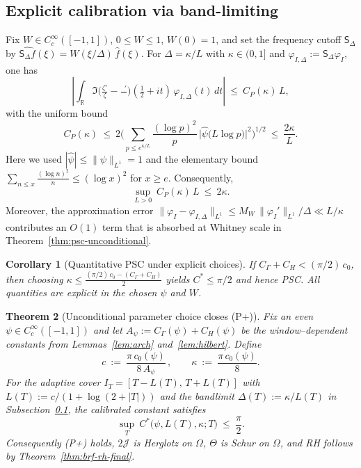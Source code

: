 \documentclass[11pt]{article}
\newtheorem{theorem}{Theorem}
\newtheorem{corollary}[theorem]{Corollary}
\theoremstyle{definition}
\theoremstyle{remark}
\newcommand{\R}{\mathbb{R}}
\DeclareMathOperator{\dettwo}{det_2}
\begin{document}
\subsection{Explicit calibration via band-limiting}\label{subsec:explicit-calibration}
Fix $W\in C_c^\infty([-1,1])$, $0\le W\le 1$, $W(0)=1$, and set the frequency cutoff $\mathsf S_\Delta$ by $\widehat{\mathsf S_\Delta f}(\xi)=W(\xi/\Delta)\,\widehat f(\xi)$. For $\Delta=\kappa/L$ with $\kappa\in(0,1]$ and $\varphi_{I,\Delta}:=\mathsf S_\Delta\varphi_I$, one has
\[
 \left|\int_\R \Im\Big(\tfrac{\zeta'}{\zeta}-\tfrac{\dettwo'}{\dettwo}\Big)\!(\tfrac12+it)\,\varphi_{I,\Delta}(t)\,dt\right|
 \ \le\ C_P(\kappa)\,L,
\]
with the uniform bound
\[
 C_P(\kappa)\ \le\ 2\Bigg(\sum_{p\le e^{\kappa/L}} \frac{(\log p)^2}{p}\,\big|\widehat\psi\big(L\log p\big)\big|^2\Bigg)^{1/2}
 \ \le\ \frac{2\kappa}{L}.
\]
Here we used $|\widehat\psi|\le \|\psi\|_{L^1}=1$ and the elementary bound $\sum_{n\le x}\frac{(\log n)^2}{n}\le (\log x)^2$ for $x\ge e$. Consequently,
\[
 \sup_{L>0}\ C_P(\kappa)\,L\ \le\ 2\kappa.
\]
Moreover, the approximation error $\|\varphi_I-\varphi_{I,\Delta}\|_{L^1}\le M_W\,\|\varphi_I'\|_{L^1}/\Delta\ll L/\kappa$ contributes an $O(1)$ term that is absorbed at Whitney scale in Theorem~\ref{thm:psc-unconditional}.

\begin{corollary}[Quantitative PSC under explicit choices]\label{cor:psc-quant}
If $C_\Gamma+C_H < (\pi/2)\,c_0$, then choosing $\kappa\le \frac{(\pi/2)\,c_0-(C_\Gamma+C_H)}{2}$ yields $C^*\le \pi/2$ and hence PSC. All quantities are explicit in the chosen $\psi$ and $W$.
\end{corollary}

\begin{theorem}[Unconditional parameter choice closes (P+)]\label{thm:unconditional-choice}
Fix an even $\psi\in C_c^\infty([-1,1])$ and let $A_\psi:=C_\Gamma(\psi)+C_H(\psi)$ be the window–dependent constants from Lemmas~\ref{lem:arch} and~\ref{lem:hilbert}. Define
\[
 c\ :=\ \frac{\pi\,c_0(\psi)}{8\,A_\psi}\,,\qquad \kappa\ :=\ \frac{\pi\,c_0(\psi)}{8}.
\]
For the adaptive cover $I_T=[T-L(T),\,T+L(T)]$ with $L(T):=c/(1+\log(2+|T|))$ and the bandlimit $\Delta(T):=\kappa/L(T)$ in Subsection~\ref{subsec:explicit-calibration}, the calibrated constant satisfies
\[
 \sup_T\ C^*\big(\psi,L(T),\kappa;T\big)\ \le\ \frac{\pi}{2}.
\]
Consequently \emph{(P+)} holds, $2\mathcal J$ is Herglotz on $\Omega$, $\Theta$ is Schur on $\Omega$, and \textup{RH} follows by Theorem~\ref{thm:brf-rh-final}.
\end{theorem}
\end{document}
